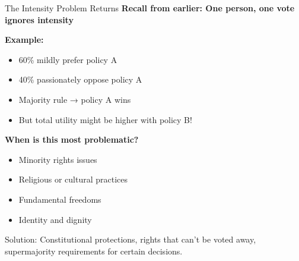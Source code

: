 \documentclass[10pt]{beamer}
\begin{document}
\begin{frame}{The Intensity Problem Returns}
\textbf{Recall from earlier: One person, one vote ignores intensity}



\textbf{Example:}
\begin{itemize}
\item 60\% mildly prefer policy A
\item 40\% passionately oppose policy A
\item Majority rule → policy A wins
\item But total utility might be higher with policy B!
\end{itemize}



\textbf{When is this most problematic?}
\begin{itemize}
\item Minority rights issues
\item Religious or cultural practices
\item Fundamental freedoms
\item Identity and dignity
\end{itemize}



\alert{Solution:} Constitutional protections, rights that can't be voted away, supermajority requirements for certain decisions.
\end{frame}
\end{document}
